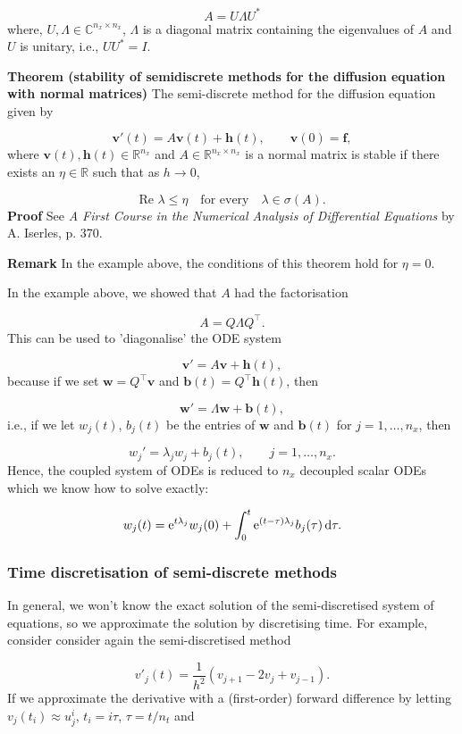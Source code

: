 \documentclass[12pt,a4paper]{article}
\begin{document}
\[
A = U \Lambda U^*
\]
where, $U, \Lambda \in \mathbb{C}^{n_x \times n_x}$, $\Lambda$ is a diagonal matrix containing the eigenvalues of $A$ and $U$ is unitary, i.e., $UU^* = I$.

\textbf{Theorem (stability of semidiscrete methods for the diffusion equation with normal matrices)} The semi-discrete method for the diffusion equation given by  

\[
\mathbf{v}'(t) = A\mathbf{v}(t) + \mathbf{h}(t), \qquad \mathbf{v}(0) = \mathbf{f}, 
\]
where $\mathbf{v}(t), \mathbf{h}(t) \in \mathbb{R}^{n_x}$ and  $A \in \mathbb{R}^{n_x \times n_x}$ is a normal matrix is stable if there exists an $\eta \in \mathbb{R}$ such that as $h \to 0$,

\[
\text{Re } \lambda \leq \eta \quad \text{for every} \quad \lambda \in \sigma(A).
\]
\textbf{Proof}  See \emph{A First Course in the Numerical Analysis of Differential Equations} by A. Iserles, p. 370.

\textbf{Remark} In the example above, the conditions of this theorem hold for $\eta = 0$.

In the example above, we showed that $A$ had the factorisation

\[
A = Q\Lambda Q^{\top}.
\]
This can be used to 'diagonalise' the ODE system

\[
\mathbf{v}' = A\mathbf{v} + \mathbf{h}(t),
\]
because if we set $\mathbf{w} = Q^{\top}\mathbf{v}$ and $\mathbf{b}(t) = Q^{\top}\mathbf{h}(t)$, then

\[
\mathbf{w}' = \Lambda \mathbf{w} + \mathbf{b}(t), 
\]
i.e., if we let $w_j(t)$, $b_j(t)$ be the entries of $\mathbf{w}$ and $\mathbf{b}(t)$ for $j = 1, \ldots, n_x$, then

\[
w_j' = \lambda_j w_j + b_j(t), \qquad j = 1, \ldots, n_x.
\]
Hence, the coupled system of ODEs is reduced to $n_x$ decoupled scalar ODEs which we know how to solve exactly:

\[
w_j(t) = {\rm e}^{t\lambda_j}w_j(0) + \int_0^t {\rm e}^{(t - \tau)\lambda_j}b_j(\tau)\,{\rm d}\tau.
\]
\subsubsection{Time discretisation of semi-discrete methods}
In general, we won't know the exact solution of the semi-discretised system of equations, so we approximate the solution by discretising time.  For example, consider consider again the semi-discretised method 

\[
v'_j(t) = \frac{1}{h^2}\left(v_{j+1} - 2v_j + v_{j-1}   \right).
\]
If we approximate the derivative with a (first-order) forward difference by letting $v_j(t_i) \approx u^i_j$, $t_i = i\tau$, $\tau = t/n_t$ and 
\end{document}
